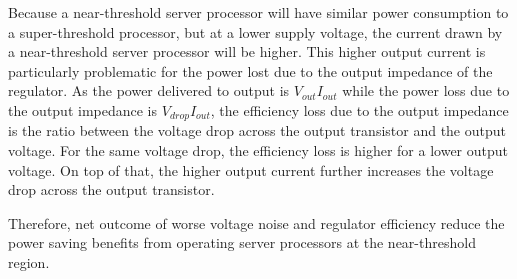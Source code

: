 Because a near-threshold server processor will have similar power consumption to a super-threshold processor, but at a lower supply voltage, the current drawn by a near-threshold server processor will be higher.
This higher output current is particularly problematic for the power lost due to the output impedance of the regulator. As the power delivered to output is $V_{out}I_{out}$ while the power loss due to the output impedance is $V_{drop}I_{out}$,   
the efficiency loss due to the output impedance is the ratio between the voltage drop across the output transistor and the output voltage. For the same voltage drop, the efficiency loss is higher for a lower output voltage. On top of that, the higher output current further increases the voltage drop across the output transistor.

Therefore, net outcome of worse voltage noise and regulator efficiency reduce the power saving benefits from operating server processors at the near-threshold region. 
